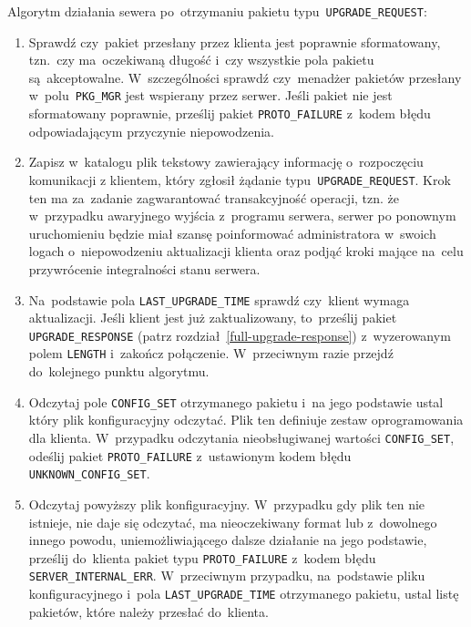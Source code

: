 \documentclass[thesis]{subfiles}
\begin{document}
Algorytm działania sewera po~otrzymaniu pakietu typu~\texttt{UPGRADE\_REQUEST}:\mynobreakpar
\begin{enumerate}
	\item Sprawdź czy~pakiet przesłany przez klienta jest poprawnie sformatowany, tzn.~czy ma~oczekiwaną długość i~czy wszystkie pola pakietu są~akceptowalne. W~szczególności sprawdź czy~menadżer pakietów przesłany w~polu~\texttt{PKG\_MGR} jest wspierany przez serwer. Jeśli pakiet nie jest sformatowany poprawnie, prześlij pakiet \texttt{PROTO\_FAILURE} z~kodem błędu odpowiadającym przyczynie niepowodzenia.
	\item\label{create-file} Zapisz w~katalogu  plik tekstowy zawierający informację o~rozpoczęciu komunikacji z klientem, który zgłosił żądanie typu~\texttt{UPGRADE\_REQUEST}. Krok ten ma za~zadanie zagwarantować transakcyjność operacji, tzn. że w~przypadku awaryjnego wyjścia z~programu serwera, serwer po ponownym uruchomieniu będzie miał szansę poinformować administratora w~swoich logach o~niepowodzeniu aktualizacji klienta oraz podjąć kroki mające na~celu przywrócenie integralności stanu serwera.
	\item Na~podstawie pola \texttt{LAST\_UPGRADE\_TIME} sprawdź czy~klient wymaga aktualizacji. Jeśli klient jest już zaktualizowany, to~prześlij pakiet \texttt{UPGRADE\_RESPONSE} (patrz rozdział~\ref{full-upgrade-response}) z~wyzerowanym polem \texttt{LENGTH} i~zakończ połączenie. W~przeciwnym razie przejdź do~kolejnego punktu algorytmu.
	\item Odczytaj pole \texttt{CONFIG\_SET} otrzymanego pakietu i~na jego podstawie ustal który plik konfiguracyjny odczytać. Plik ten definiuje zestaw oprogramowania dla klienta. W~przypadku odczytania nieobsługiwanej wartości \texttt{CONFIG\_SET}, odeślij pakiet \texttt{PROTO\_FAILURE} z~ustawionym kodem błędu \texttt{UNKNOWN\_CONFIG\_SET}.
	\item Odczytaj powyższy plik konfiguracyjny. W~przypadku gdy plik ten nie istnieje, nie daje się odczytać, ma nieoczekiwany format lub z~dowolnego innego powodu, uniemożliwiającego dalsze działanie na jego podstawie, prześlij do~klienta pakiet typu \texttt{PROTO\_FAILURE} z~kodem błędu \texttt{SERVER\_INTERNAL\_ERR}. W~przeciwnym przypadku, na~podstawie pliku konfiguracyjnego i~pola \texttt{LAST\_UPGRADE\_TIME} otrzymanego pakietu, ustal listę pakietów, które należy przesłać do~klienta.

\end{enumerate}
\end{document}
